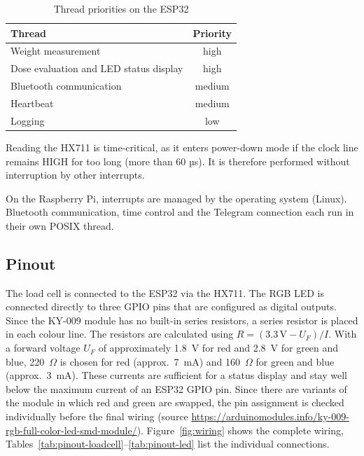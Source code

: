 \begin{table}[H]
	\centering
	\begin{tabular}{|l|c|}
		\hline
		Thread & Priority \\
		\hline
		Weight measurement & high \\
		Dose evaluation and LED status display & high \\
		Bluetooth communication & medium \\
		Heartbeat & medium \\
		Logging & low \\
		\hline
	\end{tabular}
	\caption{Thread priorities on the ESP32}
	\label{tab:prio}
\end{table}

Reading the HX711 is time-critical, as it enters power-down mode if the clock
line remains HIGH for too long (more than 60 µs). It is therefore performed
without interruption by other interrupts.

On the Raspberry Pi, interrupts are managed by the operating system (Linux).
Bluetooth communication, time control and the Telegram connection each run
in their own POSIX thread.

\subsection{Pinout}

The load cell is connected to the ESP32 via the HX711. The RGB LED is
connected directly to three GPIO pins that are configured as digital outputs.
Since the KY-009 module has no built-in series resistors, a series resistor is
placed in each colour line. The resistors are calculated using
$R = (3.3\,\mathrm{V} - U_F) / I$. With a forward voltage $U_F$ of
approximately 1.8~V for red and 2.8~V for green and blue, 220~$\Omega$ is
chosen for red (approx.\ 7~mA) and 160~$\Omega$ for green and blue
(approx.\ 3~mA). These currents are sufficient for a status display and stay
well below the maximum current of an ESP32 GPIO pin. Since there are variants of the module in which red
and green are swapped, the pin assignment is checked individually before the
final wiring (source
\url{https://arduinomodules.info/ky-009-rgb-full-color-led-smd-module/}).
Figure~\ref{fig:wiring} shows the complete wiring, Tables~\ref{tab:pinout-loadcell}--\ref{tab:pinout-led} list the individual connections.

